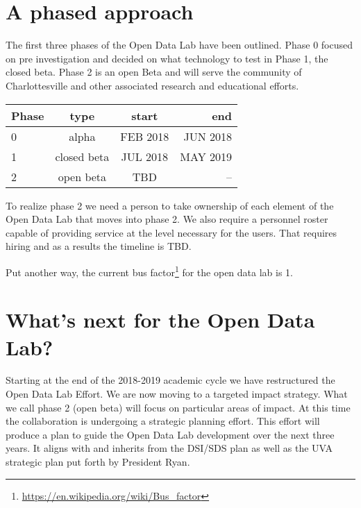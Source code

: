 \section{A phased approach}
\label{phases}
The first three phases of the Open Data Lab have been outlined. Phase 0 focused on pre investigation and decided on what technology to test in Phase 1, the closed beta. Phase 2 is an open Beta and will serve the community of Charlottesville and other associated research and educational efforts.
\begin{center}
\begin{tabular}{lccr}
\hline
\hline
Phase & type & start & end \\
\hline
0 & alpha & FEB 2018 & JUN 2018\\
1 & closed beta & JUL 2018 & MAY 2019 \\
2 & open beta & TBD & -- \\
\hline
\hline
\end{tabular}
\end{center}
To realize phase 2 we need a person to take ownership of each element of the Open Data Lab that moves into phase 2. We also require a personnel roster capable of providing service at the level necessary for the users. That requires hiring and as a results the timeline is TBD.

Put another way, the current bus factor\footnote{\url{https://en.wikipedia.org/wiki/Bus_factor}} for the open data lab is 1.

\section{What's next for the Open Data Lab?}
Starting at the end of the 2018-2019 academic cycle we have restructured the Open Data Lab Effort. We are now moving to a targeted impact strategy. What we call phase 2 (open beta) will focus on particular areas of impact. At this time the collaboration is undergoing a strategic planning effort. This effort will produce a plan to guide the Open Data Lab development over the next three years. It aligns with and inherits from the DSI/SDS plan as well as the UVA strategic plan put forth by President Ryan.
